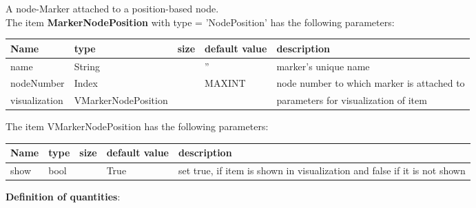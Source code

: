A node-Marker attached to a position-based node.
 \\\vspace{12pt} \noindent The item {\bf MarkerNodePosition} with type = 'NodePosition' has the following parameters:\vspace{-1cm}\\ 
\begin{center}
  \footnotesize
  \begin{longtable}{| p{4.5cm} | p{2.5cm} | p{0.5cm} | p{2.5cm} | p{6cm} |}
    \hline
    \bf Name & \bf type & \bf size & \bf default value & \bf description \\ \hline
    name &     String &      &     '' &     marker's unique name\\ \hline
    nodeNumber &     Index &      &     MAXINT &     node number to which marker is attached to\\ \hline
    visualization & VMarkerNodePosition & & & parameters for visualization of item \\ \hline
	  \end{longtable}
	\end{center}
The item VMarkerNodePosition has the following parameters:\vspace{-1cm}\\ 
\begin{center}
  \footnotesize
  \begin{longtable}{| p{4.5cm} | p{2.5cm} | p{0.5cm} | p{2.5cm} | p{6cm} |}
    \hline
    \bf Name & \bf type & \bf size & \bf default value & \bf description \\ \hline
    show &     bool &      &     True &     set true, if item is shown in visualization and false if it is not shown\\ \hline
	  \end{longtable}
	\end{center}
{\bf Definition of quantities}:\\
\newpage

